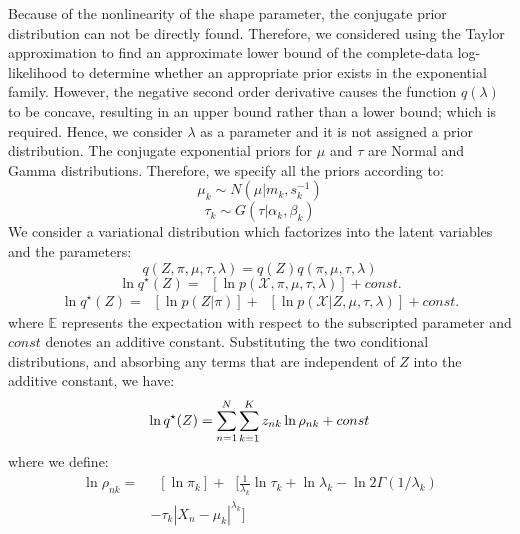 \documentclass[conference]{IEEEtran}
\begin{document}
Because of the nonlinearity of the shape parameter, the conjugate prior distribution can not be directly found. Therefore, we considered using the Taylor approximation to find an 
approximate lower bound of the complete-data log-likelihood to determine whether an appropriate prior exists in the exponential family. 
However, the negative second order derivative causes the function $q(\lambda)$ to be concave, resulting in an upper bound rather than a lower bound; which is required.
Hence, we consider $\lambda$ as a parameter and it is not assigned a prior distribution\cite{b5}. 
The conjugate exponential priors for $\mu$ and $\tau$ are Normal and Gamma distributions. Therefore, we specify all the priors according to:
\begin{equation}
    \mu_k \sim N(\mu| m_k, s_k^{-1})   
\end{equation}
\begin{equation}
    \tau_k \sim G(\tau|\alpha_k, \beta_k)    
\end{equation}
We consider a variational distribution which factorizes into the latent
variables and the parameters:
\begin{equation}
    q(Z, \pi, \mu, \tau, \lambda) = q(Z)q(\pi, \mu, \tau, \lambda)
\end{equation}
\begin{equation}
    \ln q^\star(Z) = \mathop{\mathbb{E}_{\mu, \tau, \pi}}[\ln p(\mathcal{X}, \pi,\mu, \tau, \lambda)] + const.
\end{equation}
\begin{equation}
    \begin{split}
        \ln q^\star(Z) = \mathop{\mathbb{E_\pi}}[\ln p(Z|\pi)]+\mathop{\mathbb{E_{\mu, \tau}}}[\ln p(\mathcal{X}|Z,\mu, \tau, \lambda)] + const.
    \end{split}
\end{equation}
where $\mathbb{E}$ represents the expectation with respect to the subscripted parameter and $const$ denotes an additive constant.
Substituting the two conditional distributions, and absorbing any terms that are independent of $Z$ into the additive constant, we have:
\begin{equation}
    \ln q^\star(Z) =  \sum_{\mathclap{n=1}}^{N} \sum_{\mathclap{k=1}}^{K}z_{nk} \ln \rho_{nk} + const
\end{equation}
where we define:
\begin{equation}
    \begin{split}\label{rownk}
        \ln \rho_{nk} = &\mathop{\mathbb{E}_{\pi}}[\ln \pi_k] + \mathop{\mathbb{E}_{\mu, \tau}}[\frac{1}{\lambda_k} \ln \tau_k + \ln \lambda_k - \ln 2\Gamma(1/\lambda_k)\\
        & - \tau_k |X_n - \mu_k|^{\lambda_k}]    
    \end{split}
\end{equation}
\end{document}
